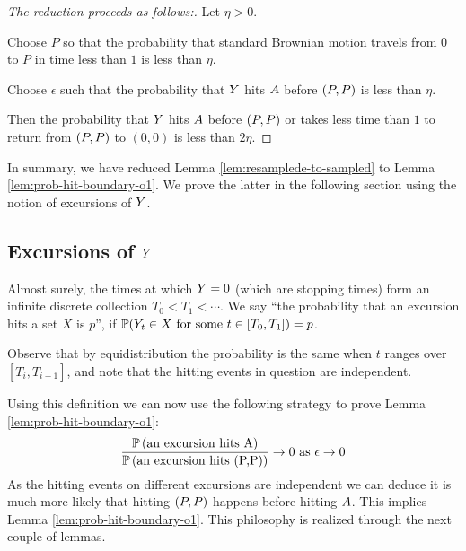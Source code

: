 {\newcommand{\origin}{(0,0)}

\begin{proof}[The reduction proceeds as follows:]

  Let $\eta > 0$.

  Choose $P$ so that the probability that standard Brownian motion
  travels from $0$ to $P$ in time less than $1$ is less than
  $\eta$.

  Choose $\epsilon$ such that the probability that $Y$ hits
  $A$ before $(P,P)$ is less than $\eta$.

  Then the probability that $Y$ hits $A$ before $(P,P)$
  or takes less time than $1$ to return from $(P,P)$ to $\origin$ is
  less than $2\eta$.

\end{proof}

In summary, we have reduced Lemma \ref{lem:resamplede-to-sampled} to
Lemma \ref{lem:prob-hit-boundary-o1}. We prove the latter in the
following section using the notion of excursions of $Y$.

\subsection{Excursions of $Y$}

\newcommand{\excursionstart}{T}
{
  Almost surely, the times at which $Y = 0$ (which are stopping
  times) form an infinite discrete collection $\excursionstart_0 <
  \excursionstart_1 < \cdots$. We say ``the probability that an excursion
  hits a set $X$ is $p$'', if $\P(\twodim_t\in X \text{
  for some } t\in [\excursionstart_0, \excursionstart_{1}]) = p$.

  Observe that by equidistribution the probability is the same when
  $t$ ranges over $[\excursionstart_i, \excursionstart_{i+1}]$, and
  note that the hitting events in question are independent.
}

\newcommand{\probexcursionhits}[1]{\P\left(\text{an excursion hits #1}\right)}

Using this definition we can now use the following strategy to
prove Lemma \ref{lem:prob-hit-boundary-o1}:
\[
\frac{\probexcursionhits{\boundarylines}}
     {\probexcursionhits{\farpoint}}
        \to 0 \text{ as } \epsilon\to0
\]
As the hitting events on different excursions are independent we
can deduce it is much more likely that hitting $(P,P)$ happens
before hitting $A$. This implies Lemma
\ref{lem:prob-hit-boundary-o1}. This philosophy is
realized through the next couple of lemmas.

}
